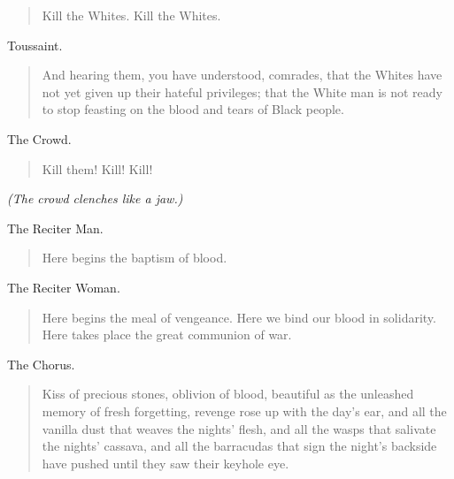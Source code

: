 \documentclass[letterpaper,article,12pt,oneside,notitlepage]{memoir}
\begin{document}
\begin{verse}
\hspace{1cm} Kill the Whites. Kill the Whites. \\
\end{verse}

\clearpage

\begin{center}Toussaint.\end{center}

\begin{verse}
\indent And hearing them, you have understood, comrades, that the Whites have not yet given up their hateful privileges; that the White man is not ready to stop feasting on the blood and tears of Black people. \\
\end{verse}

\begin{center}The Crowd.\end{center}

\begin{verse}
\hspace{1cm} Kill them! Kill! Kill! \\
\end{verse}

\textit{(The crowd clenches like a jaw.)}

\begin{center}The Reciter Man.\end{center}

\begin{verse}
\hspace{1cm} Here begins the baptism of blood. \\
\end{verse}

\begin{center}The Reciter Woman.\end{center}

\begin{verse}
\indent Here begins the meal of vengeance. Here we bind our blood in solidarity. Here takes place the great communion of war. \\
\end{verse}

\begin{center}The Chorus.\end{center}

\begin{verse}
Kiss of precious stones, oblivion of blood, beautiful as the unleashed memory of fresh forgetting, revenge rose up with the day's ear, and all the vanilla dust that weaves the nights' flesh, and all the wasps that salivate the nights' cassava, and all the barracudas that sign the night's backside have pushed until they saw their keyhole eye. \\
\end{verse}
\end{document}
